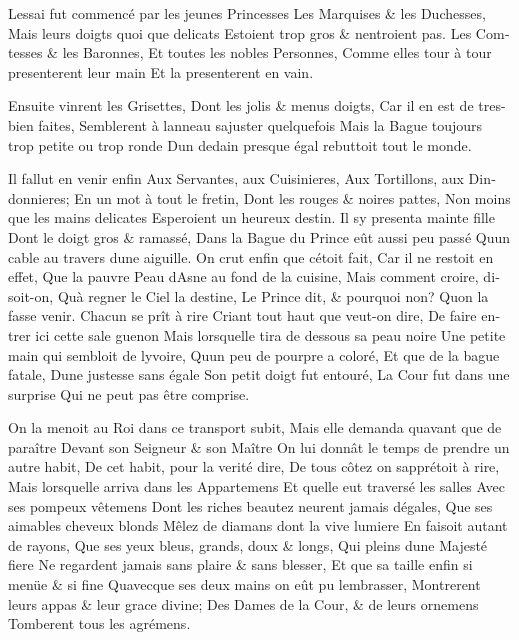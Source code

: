 \documentclass[14pt,a4paper]{memoir}
\begin{document}
\begin{otherlanguage}{french}
{L\textquotesingle essai fut commencé par les jeunes Princesses} {Les
Marquises \& les Duchesses,} {Mais leurs doigts quoi que delicats}
{Estoient trop gros \& n\textquotesingle entroient pas.} {Les Comtesses
\& les Baronnes,} {Et toutes les nobles Personnes,} {Comme elles tour à
tour presenterent leur main} {Et la presenterent en vain.}

{Ensuite vinrent les Grisettes,} {Dont les jolis \& menus doigts,} {Car
il en est de tres-bien faites,} {Semblerent à l\textquotesingle anneau
s\textquotesingle ajuster quelquefois} {Mais la Bague toujours trop
petite ou trop ronde } {D\textquotesingle un dedain presque égal
rebuttoit tout le monde. }

{Il fallut en venir enfin} {Aux Servantes, aux Cuisinieres,} {Aux
Tortillons, aux Dindonnieres;} {En un mot à tout le fretin,} {Dont les
rouges \& noires pattes,} {Non moins que les mains delicates}
{Esperoient un heureux destin.} {Il s\textquotesingle y presenta mainte
fille} {Dont le doigt gros \& ramassé,} {Dans la Bague du Prince eût
aussi peu passé} {Qu\textquotesingle un cable au travers
d\textquotesingle une aiguille.} {On crut enfin que
c\textquotesingle étoit fait,} {Car il ne restoit en effet,} {Que la
pauvre Peau d\textquotesingle Asne au fond de la cuisine, } {Mais
comment croire, disoit-on,} {Qu\textquotesingle à regner le Ciel la
destine,} {Le Prince dit, \& pourquoi non?} {Qu\textquotesingle on la
fasse venir. Chacun se prît à rire} {Criant tout haut que veut-on dire,}
{De faire entrer ici cette sale guenon} {Mais
lorsqu\textquotesingle elle tira de dessous sa peau noire} {Une petite
main qui sembloit de l\textquotesingle yvoire,} {Qu\textquotesingle un
peu de pourpre a coloré,} {Et que de la bague fatale,}
{D\textquotesingle une justesse sans égale} {Son petit doigt fut
entouré,} {La Cour fut dans une surprise} {Qui ne peut pas être
comprise.}

{On la menoit au Roi dans ce transport subit,} {Mais elle demanda
qu\textquotesingle avant que de paraître} {Devant son Seigneur \& son
Maître} {On lui donnât le temps de prendre un autre habit, } {De cet
habit, pour la verité dire,} {De tous côtez on
s\textquotesingle apprétoit à rire,} {Mais lorsqu\textquotesingle elle
arriva dans les Appartemens} {Et qu\textquotesingle elle eut traversé
les salles} {Avec ses pompeux vêtemens} {Dont les riches beautez
n\textquotesingle eurent jamais d\textquotesingle égales, } {Que ses
aimables cheveux blonds} {Mêlez de diamans dont la vive lumiere} {En
faisoit autant de rayons,} {Que ses yeux bleus, grands, doux \& longs,}
{Qui pleins d\textquotesingle une Majesté fiere} {Ne regardent jamais
sans plaire \& sans blesser,} {Et que sa taille enfin si menüe \& si
fine} {Qu\textquotesingle avecque ses deux mains on eût pu
l\textquotesingle embrasser, } {Montrerent leurs appas \& leur grace
divine; } {Des Dames de la Cour, \& de leurs ornemens} {Tomberent tous
les agrémens.}


\end{otherlanguage}
\end{document}
